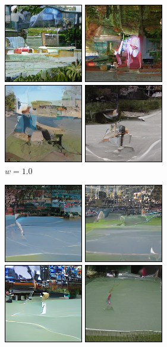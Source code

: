 \documentclass[11pt,a4paper]{article}
\begin{document}
\begin{figure}[!ht]
\centering
\begin{subfigure}[b]{0.24\textwidth}
\includegraphics[width=\linewidth]{figures/A_tennis_court_1.png}
\caption{$w=1.0$}
\end{subfigure}
\begin{subfigure}[b]{0.24\textwidth}
\includegraphics[width=\linewidth]{figures/A_tennis_court_3.png}

\end{subfigure}
\end{figure}
\end{document}
